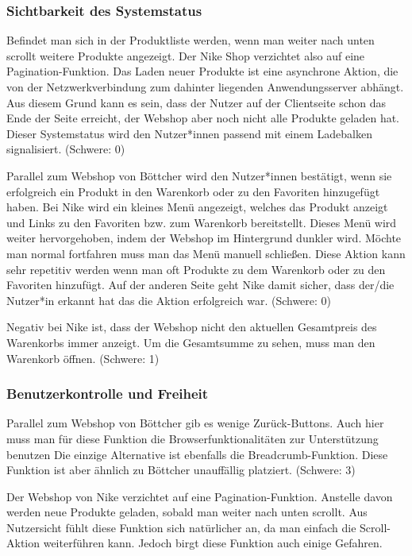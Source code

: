 \documentclass[utf8,biblatex]{lni}
\begin{document}
\subsubsection*{Sichtbarkeit des Systemstatus}
Befindet man sich in der Produktliste werden, wenn man weiter nach unten scrollt weitere Produkte angezeigt. Der Nike Shop verzichtet also auf eine Pagination-Funktion. Das Laden neuer Produkte ist eine asynchrone Aktion, die von der Netzwerkverbindung zum dahinter liegenden Anwendungsserver abhängt. Aus diesem Grund kann es sein, dass der Nutzer auf der Clientseite schon das Ende der Seite erreicht, der Webshop aber noch nicht alle Produkte geladen hat. Dieser Systemstatus wird den Nutzer*innen passend mit einem Ladebalken signalisiert. (Schwere: 0)

Parallel zum Webshop von Böttcher wird den Nutzer*innen bestätigt, wenn sie erfolgreich ein Produkt in den Warenkorb oder zu den Favoriten hinzugefügt haben. Bei Nike wird ein kleines Menü angezeigt, welches das Produkt anzeigt und Links zu den Favoriten bzw. zum Warenkorb bereitstellt. Dieses Menü wird weiter hervorgehoben, indem der Webshop im Hintergrund dunkler wird. Möchte man normal fortfahren muss man das Menü manuell schließen. Diese Aktion kann sehr repetitiv werden wenn man oft Produkte zu dem Warenkorb oder zu den Favoriten hinzufügt. Auf der anderen Seite geht Nike damit sicher, dass der/die Nutzer*in erkannt hat das die Aktion erfolgreich war. (Schwere: 0)

Negativ bei Nike ist, dass der Webshop nicht den aktuellen Gesamtpreis des Warenkorbs immer anzeigt. Um die Gesamtsumme zu sehen, muss man den Warenkorb öffnen. (Schwere: 1)


\subsubsection*{Benutzerkontrolle und Freiheit}
Parallel zum Webshop von Böttcher gib es wenige Zurück-Buttons. Auch hier muss man für diese Funktion die Browserfunktionalitäten zur Unterstützung benutzen Die einzige Alternative ist ebenfalls die Breadcrumb-Funktion. Diese Funktion ist aber ähnlich zu Böttcher unauffällig platziert. (Schwere: 3)

Der Webshop von Nike verzichtet auf eine Pagination-Funktion. Anstelle davon werden neue Produkte geladen, sobald man weiter nach unten scrollt. Aus Nutzersicht fühlt diese Funktion sich natürlicher an, da man einfach die Scroll-Aktion weiterführen kann. Jedoch birgt diese Funktion auch einige Gefahren.
\end{document}
